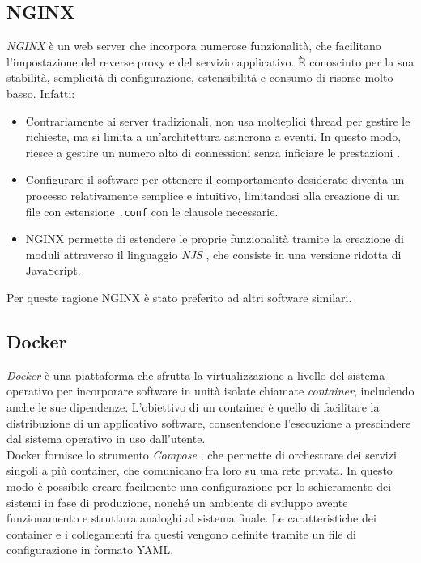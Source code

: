 \subsection{NGINX}
\textit{NGINX} \cite{nginx_bib} è un web server che incorpora numerose funzionalità, che facilitano l'impostazione del reverse proxy e del servizio applicativo. 
È conosciuto per la sua stabilità, semplicità di configurazione, estensibilità e consumo di risorse molto basso. Infatti:
\begin{itemize}
    \item 
    Contrariamente ai server tradizionali,  
    non usa molteplici thread per gestire le richieste, ma si limita a un'architettura asincrona a eventi. 
    In questo modo, riesce a gestire un numero alto di connessioni senza inficiare le prestazioni \cite{nginx_doc}. 
    
    \item Configurare il software per ottenere il comportamento desiderato diventa un processo relativamente semplice e intuitivo, limitandosi
    alla creazione di un file con estensione \texttt{.conf} con le clausole necessarie. 
    \item NGINX permette di estendere le proprie funzionalità tramite la creazione di moduli attraverso il linguaggio \textit{NJS} \cite{njs_doc}, 
    che consiste in una versione ridotta di JavaScript. 
\end{itemize}
Per queste ragione NGINX è stato preferito ad altri software similari.

\subsection{Docker}
\textit{Docker} \cite{docker_doc} è una piattaforma che sfrutta la virtualizzazione a livello del sistema operativo per incorporare software 
in unità isolate chiamate \textit{container}, includendo anche le sue dipendenze. L'obiettivo di un container è quello di 
facilitare la distribuzione di un applicativo software, consentendone l'esecuzione a prescindere dal sistema operativo 
in uso dall'utente. 
\\ Docker fornisce lo strumento \textit{Compose} \cite{docker_comp}, che permette di orchestrare dei servizi singoli a più container, 
che comunicano fra loro su una rete privata. In questo modo è possibile creare facilmente una configurazione per lo schieramento dei sistemi in fase di produzione, 
nonché un ambiente di sviluppo avente funzionamento e struttura analoghi al sistema finale. Le caratteristiche dei container e i collegamenti fra questi
 vengono definite tramite un file di configurazione in formato YAML. 


